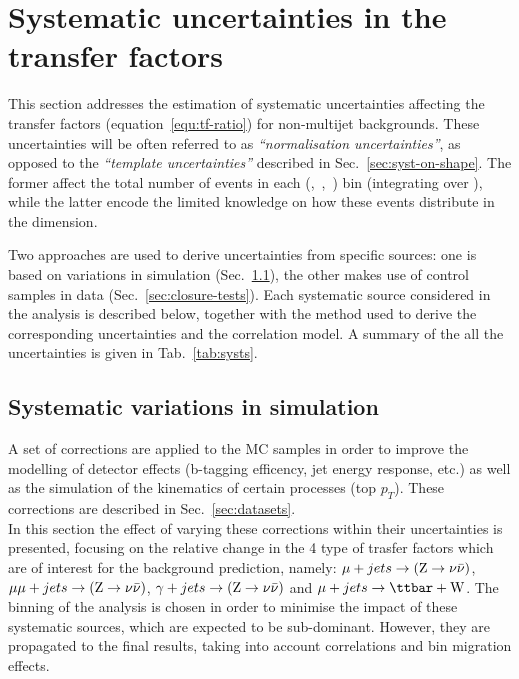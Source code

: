 \section{Systematic uncertainties in the transfer factors}
\label{sec:systematics}

This section addresses the estimation of systematic uncertainties
affecting the transfer factors (equation~\ref{equ:tf-ratio})
for non-multijet backgrounds. 
These uncertainties will be often referred to as \textit{``normalisation uncertainties''}, 
as opposed to the \textit{``template uncertainties''} described in Sec.~\ref{sec:syst-on-shape}. 
The former affect the total number of events in each (\njet,~\nb,~\scalht) bin (integrating over \mht), 
while the latter encode the limited knowledge on how these events distribute in the \mht dimension.

Two approaches are used to derive uncertainties from specific sources:
one is based on variations in simulation (Sec.~\ref{sec:mc-variations}), the other makes use of control samples in data (Sec.~\ref{sec:closure-tests}).
Each systematic source considered in the analysis is described below, 
together with the method used to derive the corresponding uncertainties and the correlation model. 
A summary of the all the uncertainties is given in Tab.~\ref{tab:systs}.



\subsection{Systematic variations in simulation}
\label{sec:mc-variations}
A set of corrections are applied to the MC samples in order to improve the modelling 
of detector effects (b-tagging efficency, jet energy response, etc.) 
as well as the simulation of the kinematics of certain processes (top $p_{T}$). 
These corrections are described in Sec.~\ref{sec:datasets}. \\
In this section the effect of varying these corrections within their uncertainties is 
presented, focusing on the relative change in the 4 type of trasfer factors which are of interest 
for the background prediction, namely: $\mj \rightarrow (\znunu)$,
$\mmj \rightarrow (\znunu)$, $\gj \rightarrow (\znunu)$ and $\mj
\rightarrow \mathrm{\ttbar+W}$. 
The binning of the analysis is chosen in order to minimise the impact of 
these systematic sources, which are expected to be sub-dominant. 
However, they are propagated to the final results, taking into account correlations and bin migration effects.


